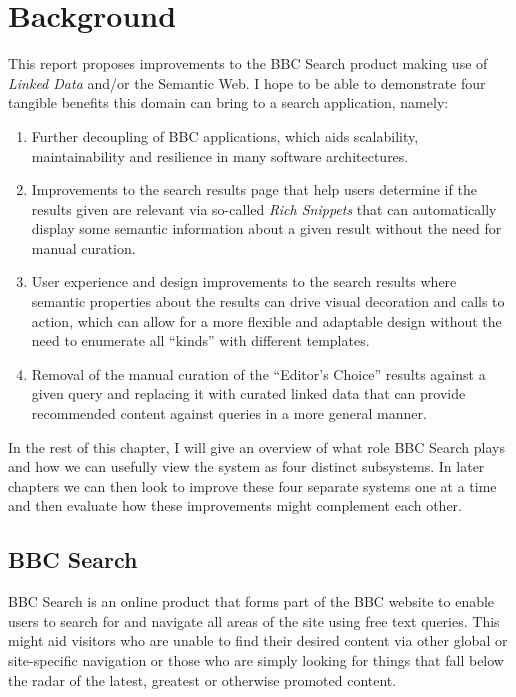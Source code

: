 \chapter{Background}
\label{intro}

This report proposes improvements to the BBC Search product making use
of \emph{Linked Data}\cite{bizer2009linked} and/or the Semantic
Web\cite{berners2001semantic}. I hope to be able to demonstrate four tangible
benefits this domain can bring to a search application, namely:

\begin{enumerate}
  \item Further decoupling of BBC applications, which aids scalability,
    maintainability and resilience in many software architectures.\cite{}
  \item Improvements to the search results page that help users determine
    if the results given are relevant via so-called
    \emph{Rich Snippets}\cite{goel2009introducing}
    that can automatically display some semantic information about a given
    result without the need for manual curation.
  \item User experience and design improvements to the search results
    where semantic properties about the results can drive visual decoration
    and calls to action, which can allow for a more flexible and
    adaptable design without the need to enumerate all ``kinds'' with
    different templates.
  \item Removal of the manual curation of the ``Editor's Choice'' results
    against a given query and replacing it with curated linked data that
    can provide recommended content against queries in a more general
    manner.
\end{enumerate}

In the rest of this chapter, I will give an overview of what role BBC
Search plays and how we can usefully view the system as four
distinct subsystems. In later chapters we can then look to improve these
four separate systems one at a time and then evaluate how these improvements
might complement each other.

\section{BBC Search}

BBC Search is an online product that forms part of the BBC website
to enable users to search for and navigate all areas of the site using
free text queries. This might aid visitors who are unable to find their desired
content via other global or site-specific navigation or those who are simply
looking for things that fall below the radar of the latest, greatest or
otherwise promoted content.

